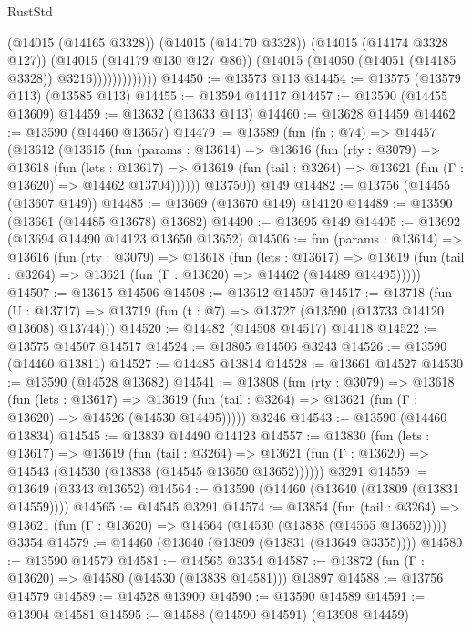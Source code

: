 \begin{lexlean}{RustStd}
\begin{coremodule}
                          (@14015 (@14165 @3328))
                          (@14015 (@14170 @3328))
                          (@14015 (@14174 @3328 @127))
                          (@14015 (@14179 @130 @127 @86))
                          (@14015 (@14050 (@14051 (@14185 @3328)) @3216)))))))))))))
@14450 := @13573 @113
@14454 := @13575 (@13579 @113) (@13585 @113)
@14455 := @13594 @14117
@14457 := @13590 (@14455 @13609)
@14459 := @13632 (@13633 @113)
@14460 := @13628 @14459
@14462 := @13590 (@14460 @13657)
@14479 := @13589
    (fun (fn : @74) =>
    @14457
      (@13612
        (@13615
          (fun (params : @13614) =>
          @13616
            (fun (rty : @3079) =>
            @13618
              (fun (lets : @13617) =>
              @13619 (fun (tail : @3264) => @13621 (fun (Γ : @13620) => @14462 @13704))))))
        @13750))
    @149
@14482 := @13756 (@14455 (@13607 @149))
@14485 := @13669 (@13670 @149) @14120
@14489 := @13590 (@13661 (@14485 @13678) @13682)
@14490 := @13695 @149
@14495 := @13692 (@13694 @14490 @14123 @13650 @13652)
@14506 := fun (params : @13614) =>
  @13616
    (fun (rty : @3079) =>
    @13618
      (fun (lets : @13617) =>
      @13619 (fun (tail : @3264) => @13621 (fun (Γ : @13620) => @14462 (@14489 @14495)))))
@14507 := @13615 @14506
@14508 := @13612 @14507
@14517 := @13718
    (fun (U : @13717) => @13719 (fun (t : @7) => @13727 (@13590 (@13733 @14120 @13608) @13744)))
@14520 := @14482 (@14508 @14517) @14118
@14522 := @13575 @14507 @14517
@14524 := @13805 @14506 @3243
@14526 := @13590 (@14460 @13811)
@14527 := @14485 @13814
@14528 := @13661 @14527
@14530 := @13590 (@14528 @13682)
@14541 := @13808
    (fun (rty : @3079) =>
    @13618
      (fun (lets : @13617) =>
      @13619 (fun (tail : @3264) => @13621 (fun (Γ : @13620) => @14526 (@14530 @14495)))))
    @3246
@14543 := @13590 (@14460 @13834)
@14545 := @13839 @14490 @14123
@14557 := @13830
    (fun (lets : @13617) =>
    @13619
      (fun (tail : @3264) =>
      @13621 (fun (Γ : @13620) => @14543 (@14530 (@13838 (@14545 @13650 @13652))))))
    @3291
@14559 := @13649 (@3343 @13652)
@14564 := @13590 (@14460 (@13640 (@13809 (@13831 @14559))))
@14565 := @14545 @3291
@14574 := @13854
    (fun (tail : @3264) => @13621 (fun (Γ : @13620) => @14564 (@14530 (@13838 (@14565 @13652)))))
    @3354
@14579 := @14460 (@13640 (@13809 (@13831 (@13649 @3355))))
@14580 := @13590 @14579
@14581 := @14565 @3354
@14587 := @13872 (fun (Γ : @13620) => @14580 (@14530 (@13838 @14581))) @13897
@14588 := @13756 @14579
@14589 := @14528 @13900
@14590 := @13590 @14589
@14591 := @13904 @14581
@14595 := @14588 (@14590 @14591) (@13908 @14459)

\end{coremodule}
\end{lexlean}
